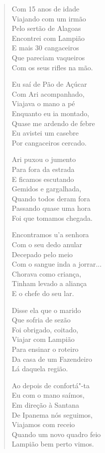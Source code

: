 \begin{verse}
Com 15 anos de idade \\
Viajando com um irmão \\
Pelo sertão de Alagoas \\
Encontrei com Lampião \\
E mais 30 cangaceiros \\
Que pareciam vaqueiros \\
Com os seus rifles na mão. 

Eu saí de Pão de Açúcar \\
Com Ari acompanhado, \\
Viajava o mano a pé \\
Enquanto eu ia montado, \\
Quase me ardendo de febre \\
Eu avistei um casebre \\
Por cangaceiros cercado. 

Ari puxou o jumento \\
Para fora da estrada \\
E ficamos escutando \\
Gemidos e gargalhada, \\
Quando todos deram fora \\
Passando quase uma hora \\
Foi que tomamos chegada. 


Encontramos u'a senhora \\
Com o seu dedo anular \\
Decepado pelo meio \\
Com o sangue inda a jorrar... \\
Chorava como criança, \\
Tinham levado a aliança \\
E o chefe do seu lar. 

Disse ela que o marido \\
Que sofria de sezão \\
Foi obrigado, coitado, \\
Viajar com Lampião \\
Para ensinar o roteiro \\
Da casa de um Fazendeiro \\
Lá daquela região. 

Ao depois de confortá"-ta \\
Eu com o mano saímos, \\
Em direção à Santana \\
De Ipanema nós seguimos, \\
Viajamos com receio \\
Quando um novo quadro feio \\
Lampião bem perto vimos. 


\end{verse}
